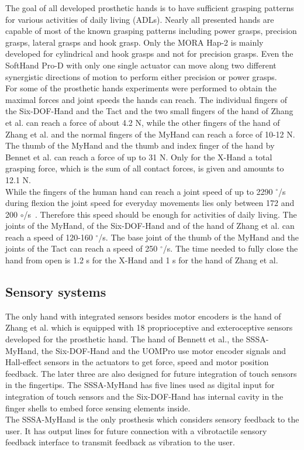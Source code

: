 \documentclass[a4paper, 10pt, conference]{ieeeconf}      %
\begin{document}
The goal of all developed prosthetic hands is to have sufficient grasping patterns for various activities of daily living (ADLs). Nearly all presented hands are capable of most of the known grasping patterns including power grasps, precision grasps, lateral grasps and hook grasp. Only the MORA Hap-2 is mainly developed for cylindrical and hook grasps and not for precision grasps. Even the SoftHand Pro-D with only one single actuator can move along two different synergistic directions of motion to perform either precision or power grasps.\\
For some of the prosthetic hands experiments were performed to obtain the maximal forces and joint speeds the hands can reach. The individual fingers of the Six-DOF-Hand and the Tact and the two small fingers of the hand of Zhang et al. can reach a force of about 4.2 N, while the other fingers of the hand of Zhang et al. and the normal fingers of the MyHand can reach a force of 10-12 N. The thumb of the MyHand and the thumb and index finger of the hand by Bennet et al. can reach a force of up to 31 N. Only for the X-Hand a total grasping force, which is the sum of all contact forces, is given and amounts to 12.1 N.\\
While the fingers of the human hand can reach a joint speed of up to 2290 $^\circ$/s during flexion the joint speed for everyday movements lies only between 172 and 200 $\circ$/s~\cite{weir}. Therefore this speed should be enough for activities of daily living. The joints of the MyHand, of the Six-DOF-Hand and of the hand of Zhang et al. can reach a speed of 120-160 $^\circ$/s. The base joint of the thumb of the MyHand and the joints of the Tact can reach a speed of 250 $^\circ$/s. The time needed to fully close the hand from open is 1.2 s for the X-Hand and 1 s for the hand of Zhang et al.

\subsection{Sensory systems}

The only hand with integrated sensors besides motor encoders is the hand of Zhang et al. which is equipped with 18 proprioceptive and exteroceptive sensors developed for the prosthetic hand. The hand of Bennett et al., the SSSA-MyHand, the Six-DOF-Hand and the UOMPro use motor encoder signals and Hall-effect sensors in the actuators to get force, speed and motor position feedback. The later three are also designed for future integration of touch sensors in the fingertips. The SSSA-MyHand has five lines used as digital input for integration of touch sensors and the Six-DOF-Hand has internal cavity in the finger shells to embed force sensing elements inside.\\
The SSSA-MyHand is the only prosthesis which considers sensory feedback to the user. It has output lines for future connection with a vibrotactile sensory feedback interface to transmit feedback as vibration to the user.
\end{document}
